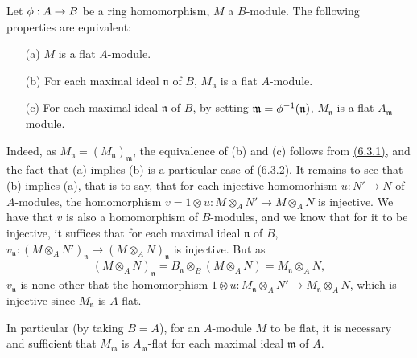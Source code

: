 \begin{env}[6.3.3]
\label{env-0.6.3.3}
Let $\phi:A\to B$ be a ring homomorphism, $M$ a $B$-module. The following
properties are equivalent:
\begin{itemize}
  \item[(a)] $M$ is a flat $A$-module.
  \item[(b)] For each maximal ideal $\mathfrak{n}$ of $B$, $M_\mathfrak{n}$ is a flat $A$-module.
  \item[(c)] For each maximal ideal $\mathfrak{n}$ of $B$, by setting
    $\mathfrak{m}=\phi^{-1}(\mathfrak{n})$, $M_\mathfrak{n}$ is a flat $A_\mathfrak{m}$-module.
\end{itemize}

Indeed, as $M_\mathfrak{n}=(M_\mathfrak{n})_\mathfrak{m}$, the equivalence of
(b) and (c) follows from \hyperref[env-0.6.3.1]{(6.3.1)}, and the fact that (a) implies (b) is
a particular case of \hyperref[env-0.6.3.2]{(6.3.2)}. It remains to see that (b) implies (a),
that is to say, that for each injective homomorhism $u:N'\to N$ of $A$-modules, the
homomorphism $v=1\otimes u:M\otimes_A N'\to M\otimes_A N$ is injective. We have that $v$ is
also a homomorphism of $B$-modules, and we know that for it to be injective, it suffices that
for each maximal ideal $\mathfrak{n}$ of $B$,
$v_\mathfrak{n}:(M\otimes_A N')_\mathfrak{n}\to(M\otimes_A N)_\mathfrak{n}$ is injective. But
as
\[
  (M\otimes_A N)_\mathfrak{n}=B_\mathfrak{n}\otimes_B(M\otimes_A N)
  =M_\mathfrak{n}\otimes_A N,
\]
$v_\mathfrak{n}$ is none other that the homomorphism
$1\otimes u:M_\mathfrak{n}\otimes_A N'\to M_\mathfrak{n}\otimes_A N$, which is injective
since $M_\mathfrak{n}$ is $A$-flat.

In particular (by taking $B=A$), for an $A$-module $M$ to be flat, it is necessary and
sufficient that $M_\mathfrak{m}$ is $A_\mathfrak{m}$-flat for each maximal ideal
$\mathfrak{m}$ of $A$.
\end{env}

